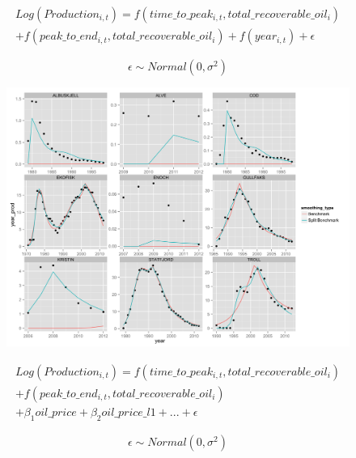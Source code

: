 \documentclass{beamer}
\begin{document}
\begin{frame}[plain]
	\begin{multline}
	\nonumber Log(Production_{i,t})=f(time\_to\_peak_{i,t}, total\_recoverable\_oil_i) \\
	+ f(peak\_to\_end_{i,t}, total\_recoverable\_oil_i)
	+ f(year_{i,t}) + \epsilon
	\end{multline}

	\begin{equation}
		\nonumber \epsilon \sim Normal(0, \sigma^2)
		\end{equation}
\end{frame}

\begin{frame}[plain]
	\begin{figure}
	\includegraphics[width=1\textwidth]{bench_vs_split.png}
	\end{figure}
	
\end{frame}

\begin{frame}[plain]
		\begin{multline}
	\nonumber Log(Production_{i,t})=f(time\_to\_peak_{i,t}, total\_recoverable\_oil_i) \\
	+ f(peak\_to\_end_{i,t}, total\_recoverable\_oil_i) \\
	+ \beta_1 oil\_price + \beta_2 oil\_price\_l1 + ... +  \epsilon
	\end{multline}

		\begin{equation}
		\nonumber \epsilon \sim Normal(0, \sigma^2)
		\end{equation}
\end{frame}
\end{document}
